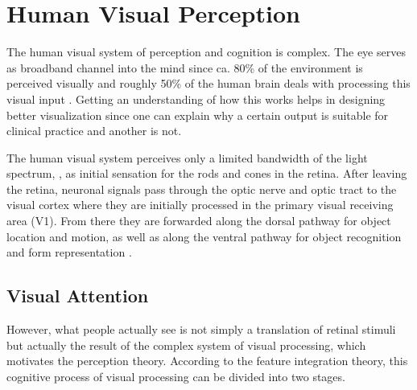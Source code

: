 \section{Human Visual Perception}
\label{sec:background:perception}
The human visual system of perception and cognition is complex.
The eye serves as broadband channel into the mind since ca. 80\% of the environment is perceived visually \CN and roughly 50\% of the human brain deals with processing this visual input \CN.
Getting an understanding of how this works helps in designing better visualization since one can explain why a certain output is suitable for clinical practice and another is not.

The human visual system perceives only a limited bandwidth of the light spectrum, , as initial sensation for the rods and cones in the retina.
After leaving the retina, neuronal signals pass through the optic nerve and optic tract to the visual cortex where they are initially processed in the primary visual receiving area (V1). 
From there they are forwarded along the dorsal pathway for object location and motion, as well as along the ventral pathway for object recognition and form representation \cite{Goldstein:2013:Perception}.

\subsection{Visual Attention}
However, what people actually see is not simply a translation of retinal stimuli but actually the result of the complex system of visual processing, which motivates the perception theory.
According to the feature integration theory, this cognitive process of visual processing can be divided into two stages.

